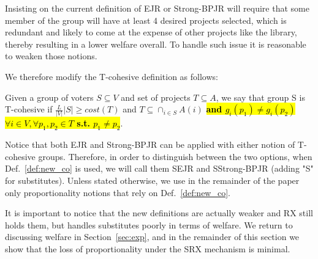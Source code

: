 \documentclass[runningheads]{llncs}
\newcommand{\kibitz}[2]{\ifnum\Comments=1{\color{#1}{#2}}\fi}
\newcommand{\rf}[1]{\kibitz{blue}{[Roy says:#1]}}
\begin{document}
Insisting on the current definition of EJR or Strong-BPJR will require that some member of the group will have at least 4 desired projects selected, which is redundant and likely to come at the expense of other projects like the library, thereby resulting in a lower welfare overall. To handle such issue it is reasonable to weaken those notions.

We therefore modify the T-cohesive definition as follows:


\begin{definition}\label{def:new_co} Given a group of voters $S\subseteq V$ and set of projects $T\subseteq A$, we say that group S is T-cohesive if $\frac{L}{|V|}|S|\geq cost(T)$ and $T\subseteq \cap_{i\in S}A(i)$ \hl{\textbf{and $g_i(p_1)\neq g_i(p_2)$  $\forall i\in V, \forall p_1,p_2\in T$ s.t. $p_1\neq p_2$}}.
\end{definition}

\rf{Added here the usage of SEJR}
Notice that both EJR and Strong-BPJR can be applied with either notion of T-cohesive groups. Therefore, in order to distinguish between the two options, when Def.~\ref{def:new_co} is used, we will call them SEJR and SStrong-BPJR (adding "S" for substitutes). Unless stated otherwise, we use in the remainder of the paper only proportionality notions that rely on Def.~\ref{def:new_co}.

It is important to notice that the new definitions are actually weaker and RX still holds them, but handles substitutes poorly in terms of welfare. We return to discussing  welfare in Section~\ref{sec:exp}, and in the remainder of this section we show that the loss of proportionality under the SRX mechanism is minimal.



 
\end{document}
